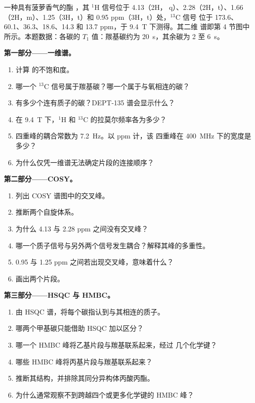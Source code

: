 \begin{problem}
\label{pb:b3:advanced-nmr:1}
一种具有菠萝香气的酯 ，其 ${}^1$H 信号位于 4.13（2H，
q）、2.28（2H，t）、1.66（2H，m）、1.25（3H，t）和 0.95 ppm（3H，t）处，${}^{13}$C 信号
位于 173.6、60.1、36.3、18.6、14.3 和 13.7 ppm，于 \qty{9.4}{T} 下测得。其二维
谱即第 4 节图中所示。本题数据：各碳的 $T_1$
值：羰基碳约为 \qty{20}{s}，其余碳为 2 至
\qty{6}{s}。

\medskip\noindent\textbf{第一部分——一维谱。}
\begin{enumerate}
  \item 计算  的不饱和度。
  \item 哪一个 ${}^{13}$C 信号属于羰基碳？哪一个属于与氧相连的碳？
  \item 有多少个连有质子的碳？DEPT-135 谱会显示什么？
  \item 在 \qty{9.4}{T} 下，${}^1$H 和 ${}^{13}$C 的拉莫尔频率各为多少？
  \item 四重峰的耦合常数为 \qty{7.2}{Hz}。以 ppm 计，该
        四重峰在 \qty{400}{MHz} 下的宽度是多少？
  \item 为什么仅凭一维谱无法确定片段的连接顺序？
\end{enumerate}

\medskip\noindent\textbf{第二部分——COSY。}
\begin{enumerate}[resume]
  \item 列出 COSY 谱图中的交叉峰。
  \item 推断两个自旋体系。
  \item 为什么 4.13 与 2.28 ppm 之间没有交叉峰？
  \item 哪一个质子信号与另外两个信号发生耦合？解释其峰的多重性。
  \item 0.95 与 1.25 ppm 之间若出现交叉峰，意味着什么？
  \item 画出两个片段。
\end{enumerate}

\medskip\noindent\textbf{第三部分——HSQC 与 HMBC。}
\begin{enumerate}[resume]
  \item 由 HSQC 谱，将每个碳指认到与其相连的质子。
  \item 哪两个甲基碳只能借助 HSQC 加以区分？
  \item 哪一个 HMBC 峰将乙基片段与羰基联系起来，经过
        几个化学键？
  \item 哪些 HMBC 峰将丙基片段与羰基联系起来？
  \item 推断其结构，并排除其同分异构体丙酸丙酯。
  \item 为什么通常观察不到跨越四个或更多化学键的 HMBC 峰？
\end{enumerate}


\end{problem}

